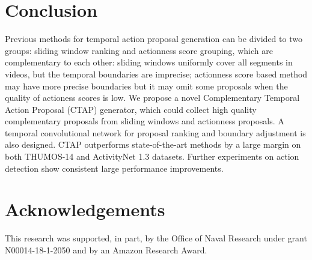 \documentclass[runningheads]{llncs}
\begin{document}
\section{Conclusion}
Previous methods for temporal action proposal generation can be divided to two groups: sliding window ranking and actionness score grouping, which are complementary to each other: sliding windows uniformly cover all segments in videos, but the temporal boundaries are imprecise; actionness score based method may have more precise boundaries but it may omit some proposals when the quality of actioness scores is low. We propose a novel Complementary Temporal Action Proposal (CTAP) generator, which could collect high quality complementary proposals from sliding windows and actionness proposals. A temporal convolutional network for proposal ranking and boundary adjustment is also designed. CTAP outperforms state-of-the-art methods by a large margin on both THUMOS-14 and ActivityNet 1.3 datasets. Further experiments on action detection show consistent large performance improvements.  

\section*{Acknowledgements}
This research was supported, in part, by the Office of Naval Research under grant N00014-18-1-2050 and by an Amazon Research Award. 



\end{document}
